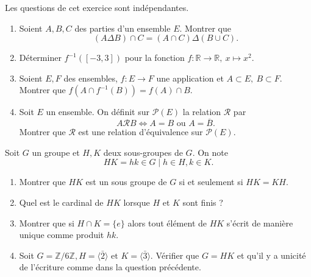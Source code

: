 \begin{exercise}[from=Devoir MPI 2019,nosol]
	Les questions de cet exercice sont indépendantes.
	\begin{enumerate}
		\item Soient $A,B,C$ des parties d'un ensemble $E$. Montrer que
		$$
			(A \Delta B) \cap C=(A \cap C) \Delta(B \cup C).
		$$
		\item Déterminer $f^{-1}([-3,3])$ pour la fonction $f:\mathbb{R}\rightarrow\mathbb{R},\ x \mapsto x^2$.
		\item Soient $E,F$ des ensembles, $f:E \rightarrow F$ une application et $A \subset E,\ B \subset F$.
		Montrer que $f(A \cap f^{-1}(B))=f(A) \cap B$.
		\item Soit $E$ un ensemble. On définit sur $\mathcal{P}(E)$ la relation $\mathcal{R}$ par
		$$
			A \mathcal{R} B \Longleftrightarrow A = B \text{ ou } A = \overline{B}.
		$$
		Montrer que $\mathcal{R}$ est une relation d'équivalence sur $\mathcal{P}(E)$.
	\end{enumerate}
\end{exercise}

\begin{exercise}[from=Devoir MPI 2019,nosol]
	Soit $G$ un groupe et $H,K$ deux sous-groupes de $G$. On note
	$$
		HK=hk \in G \mid h \in H,k \in K.
	$$
	\begin{enumerate}
		\item Montrer que $HK$ est un sous groupe de $G$ si et seulement si $HK=KH$.
		\item Quel est le cardinal de $HK$ lorsque $H$ et $K$ sont finis ?
		\item Montrer que si $H \cap K = \{e\}$ alors tout élément de $HK$ s'écrit de manière unique comme produit $hk$.
		\item Soit $G=\mathbb{Z}/6\mathbb{Z}, H=\langle \bar{2}\rangle \text{ et } K=\langle\bar{3}\rangle$. Vérifier que $G=HK$ et qu'il y a unicité de l'écriture comme dans la question précédente.
	\end{enumerate}
\end{exercise}

